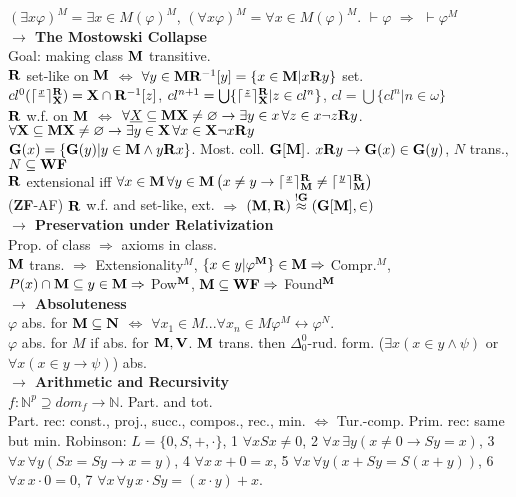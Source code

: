 \documentclass[9pt]{article}
\newcommand{\class}[1]{{\bf #1}}
\newcommand{\N}{\mathbb{N}}
\newcommand{\mytitle}[1]{ {\bf $\rightarrow$ #1}\\}
\newcommand{\V}{\class{V}}
\newcommand{\M}{\class{M}}
\newcommand{\Rr}{\class{R}}
\newcommand{\WF}{\class{WF}}
\newcommand{\X}{\class{X}}
\begin{document}
\begin{multicols*}{2}
$(\exists x \varphi)^M=\exists x\in M(\varphi)^M$, $(\forall x \varphi)^M=\forall x\in M(\varphi)^M$. $\vdash\varphi$ $\Rightarrow$ $\vdash\varphi^M$\\
\mytitle{The Mostowski Collapse}
Goal: making class $\class{M}$ transitive.\\
$\class{R}$ set-like on $\class{M}$ $\Leftrightarrow$ $\forall y\in \class{M} \class{R}^{-1}[y]=\{x\in \class{M}|x\class{R}y\}$ set.\\
$cl^0(\lceil\frac{x}{}\rceil^\Rr_\X)=\X\cap \Rr^{-1}[z]$, $cl^{n+1}=\bigcup\{\lceil\frac{z}{}\rceil^\Rr_\X|z\in cl^n\}$, $cl=\bigcup \{cl^n|n\in\omega\}$\\
$\Rr$ w.f. on $\class{M}$ $\Leftrightarrow$ $\forall \underline{X}\subseteq \M \X\neq\varnothing\to\exists y\in x\,\forall z\in x \neg z\Rr y$.
$\forall\class{X}\subseteq\class{M} \class{X}\neq\varnothing\to\exists y\in\class{X}\,\forall x\in\class{X}\neg x\Rr y$\\
$\class{G}(x)=\{\class{G}(y)|y\in\class{M}\wedge y\class{R}x\}$. Most. coll. $\class{G}[\class{M}]$. $x\class{R}y\to \class{G}(x)\in\class{G}(y)$, $N$ trans., $N\subseteq \WF$\\
$\Rr$ extensional iff $\forall x\in\M\,\forall y\in\M\left(x\neq y\to \lceil\frac{x}{}\rceil^\Rr_\M \neq\lceil\frac{y}{}\rceil_\M^\Rr\right)$\\
(\class{ZF}-AF) $\Rr$ w.f. and set-like, ext. $\Rightarrow$ $(\M,\Rr)\overset{!\class{G}}{\approx}(\class{G}[\M],\in)$\\
\mytitle{Preservation under Relativization}
Prop. of class $\Rightarrow$ axioms in class.\\
$\class{M}$ trans. $\Rightarrow$ Extensionality$^M$, $\{x\in y|\varphi^\M\}\in\M\Rightarrow$ Compr.$^M$, $P(x)\cap\M\subseteq y\in \M\Rightarrow$ Pow$^\M$, $\M\subseteq \WF\Rightarrow$ Found$^\M$\\
\mytitle{Absoluteness}
$\varphi$ abs. for $\class{M}\subseteq\class{N}$ $\Leftrightarrow$ $\forall x_1\in M...\forall x_n\in M \varphi^M\leftrightarrow\varphi^N$.\\
$\varphi$ abs. for $M$ if abs. for $\class{M}, \V$.
$\class{M}$ trans. then $\Delta_0^0$-rud. form. ($\exists x(x\in y\wedge\psi)$ or $\forall x(x\in y\to\psi)$) abs.\\
\mytitle{Arithmetic and Recursivity}
$f\colon \N^p\supseteq dom_f\to \N$. Part. and tot.\\
Part. rec: const., proj., succ., compos., rec., min. $\Leftrightarrow$ Tur.-comp. Prim. rec: same but min.
Robinson: $L=\{0,S,+,\cdot\}$, 1 $\forall x Sx\neq 0$, 2 $\forall x\,\exists y (x\neq 0\to Sy=x)$, 3 $\forall x \,\forall y (Sx=Sy\to x=y)$, 4 $\forall x\,x+0=x$, 5 $\forall x\,\forall y (x+Sy=S(x+y))$, 6 $\forall x\,x\cdot 0=0$, 7 $\forall x\,\forall y\,x\cdot Sy=(x\cdot y)+x$.

\end{multicols*}
\end{document}
